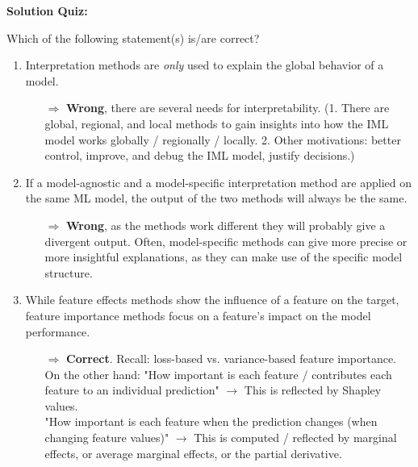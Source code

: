 \textbf{Solution Quiz:}\\\noindent
\medskip

Which of the following statement(s) is/are correct?  
	\begin{enumerate}
        \item Interpretation methods are \textit{only} used to explain the global behavior of a model.
        \begin{itemize}
        	\item[$\Rightarrow$] \textbf{Wrong}, there are several needs for interpretability. (1. There are global, regional, and local methods to gain insights into how the IML model works globally / regionally / locally. 2. Other motivations: better control, improve, and debug the IML model, justify decisions.)
        \end{itemize}
    	\item If a model-agnostic and a model-specific interpretation method are applied on the same ML model, the output of the two methods will always be the same.
    	\begin{itemize}
    		\item[$\Rightarrow$] \textbf{Wrong}, as the methods work different they will probably give a divergent output. Often, model-specific methods can give more precise or more insightful explanations, as they can make use of the specific model structure.
    	\end{itemize}
    	\item While feature effects methods show the influence of a feature on the target, feature importance methods focus on a feature's impact on the model performance.
    	\begin{itemize}
    		\item[$\Rightarrow$] \textbf{Correct}. Recall: loss-based vs. variance-based feature importance. \\
            On the other hand: "How important is each feature / contributes each feature to an individual prediction" \(\rightarrow\) This is reflected by Shapley values. \\
            "How important is each feature when the prediction changes (when changing feature values)" \(\rightarrow\) This is computed / reflected by marginal effects, or average marginal effects, or the partial derivative.

\end{itemize}
\end{enumerate}

